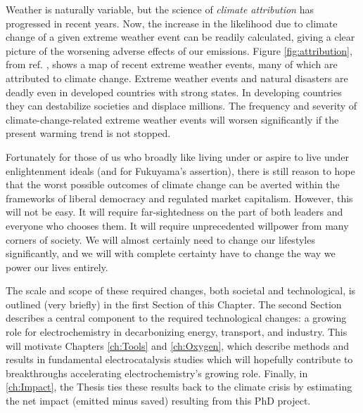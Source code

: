 Weather is naturally variable, but the science of \textit{climate attribution} has progressed in recent years. Now, the increase in the likelihood due to climate change of a given extreme weather event can be readily calculated, giving a clear picture of the worsening adverse effects of our emissions\cite{Schiermeier2018}. Figure \ref{fig:attribution}, from ref. , shows a map of recent extreme weather events, many of which are attributed to climate change. Extreme weather events and natural disasters are deadly even in developed countries with strong states. In developing countries they can destabilize societies and displace millions. The frequency and severity of climate-change-related extreme weather events will worsen significantly if the present warming trend is not stopped\cite{IPCC2018_SPM}. 

Fortunately for those of us who broadly like living under or aspire to live under enlightenment ideals (and for Fukuyama's assertion), there is still reason to hope that the worst possible outcomes of climate change can be averted within the frameworks of liberal democracy and regulated market capitalism. However, this will not be easy. It will require far-sightedness on the part of both leaders and everyone who chooses them. It will require unprecedented willpower from many corners of society. We will almost certainly need to change our lifestyles significantly, and we will with complete certainty have to change the way we power our lives entirely. 

The scale and scope of these required changes, both societal and technological, is outlined (very briefly) in the first Section of this Chapter. The second Section describes a central component to the required technological changes: a growing role for electrochemistry in decarbonizing energy, transport, and industry. This will motivate Chapters \ref{ch:Tools} and \ref{ch:Oxygen}, which describe methods and results in fundamental electrocatalysis studies which will hopefully contribute to breakthroughs accelerating electrochemistry's growing role. Finally, in \ref{ch:Impact}, the Thesis ties these results back to the climate crisis by estimating the net  impact (emitted minus saved) resulting from this PhD project.
